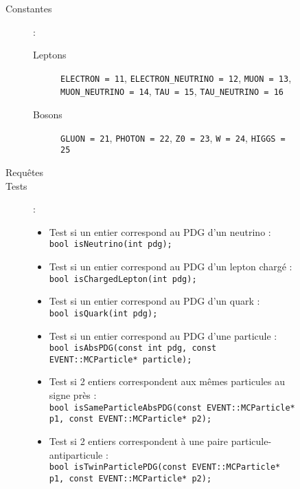 \begin{figure}[!ht]

	\begin{description}
		\item[Constantes] :\\
		\begin{flushleft}
		\begin{description}
			\item[Leptons]
    				\verb|ELECTRON = 11|,
    				\verb|ELECTRON_NEUTRINO = 12|,
    				\verb|MUON = 13|,
    				\verb|MUON_NEUTRINO = 14|,
    				\verb|TAU = 15|,
    				\verb|TAU_NEUTRINO = 16|

    			\item[Bosons]
    				\verb|GLUON = 21|,
    				\verb|PHOTON = 22|,
    				\verb|Z0 = 23|,
    				\verb|W = 24|,
    				\verb|HIGGS = 25|
		\end{description}
		\end{flushleft}
		
		\item[Requêtes]
		
		\item[Tests] :\newline
		\begin{itemize}
	
			\item Test si un entier correspond au PDG d'un neutrino :\\
\verb|bool isNeutrino(int pdg);|

			\item Test si un entier correspond au PDG d'un lepton chargé :\\
\verb|bool isChargedLepton(int pdg);|

			\item Test si un entier correspond au PDG d'un quark :\\
\verb|bool isQuark(int pdg);|

			\item Test si un entier correspond au PDG d'une particule :\\
\verb|bool isAbsPDG(const int pdg, const EVENT::MCParticle* particle);|

			\item Test si 2 entiers correspondent aux mêmes particules au signe près :\\
\verb|bool isSameParticleAbsPDG(const EVENT::MCParticle* p1, const EVENT::MCParticle* p2);|

			\item Test si 2 entiers correspondent à une paire particule-antiparticule :\\
\verb|bool isTwinParticlePDG(const EVENT::MCParticle* p1, const EVENT::MCParticle* p2);|
    

\end{itemize}
\end{description}
\end{figure}
